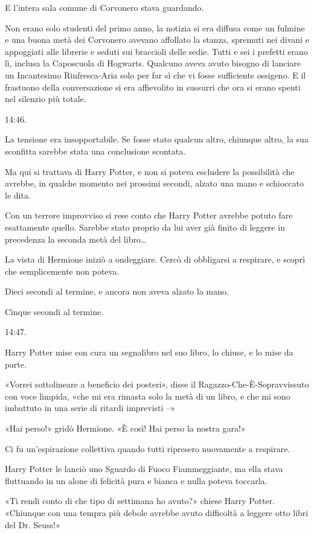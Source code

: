 E l’intera sala comune di Corvonero stava guardando.

Non erano solo studenti del primo anno, la notizia si era diffusa come un fulmine e una buona metà dei Corvonero avevano affollato la stanza, spremuti nei divani e appoggiati alle librerie e seduti sui braccioli delle sedie. Tutti e sei i prefetti erano lì, inclusa la Caposcuola di Hogwarts. Qualcuno aveva avuto bisogno di lanciare un Incantesimo Rinfresca-Aria solo per far sì che vi fosse sufficiente ossigeno. E il frastuono della conversazione si era affievolito in sussurri che ora si erano spenti nel silenzio più totale.

14:46.

La tensione era insopportabile. Se fosse stato qualcun altro, chiunque altro, la sua sconfitta sarebbe stata una conclusione scontata.

Ma qui si trattava di Harry Potter, e non si poteva escludere la possibilità che avrebbe, in qualche momento nei prossimi secondi, alzato una mano e schioccato le dita.

Con un terrore improvviso si rese conto che Harry Potter avrebbe potuto fare esattamente quello. Sarebbe stato proprio da lui aver già finito di leggere in precedenza la seconda metà del libro…

La vista di Hermione iniziò a ondeggiare. Cercò di obbligarsi a respirare, e scoprì che semplicemente non poteva.

Dieci secondi al termine, e ancora non aveva alzato la mano.

Cinque secondi al termine.

14:47.

Harry Potter mise con cura un segnalibro nel suo libro, lo chiuse, e lo mise da parte.

«Vorrei sottolineare a beneficio dei posteri», disse il Ragazzo-Che-È-Sopravvissuto con voce limpida, «che mi era rimasta solo la metà di un libro, e che mi sono imbattuto in una serie di ritardi imprevisti –»

«Hai perso!» gridò Hermione. «È così! Hai perso la nostra gara!»

Ci fu un’espirazione collettiva quando tutti ripresero nuovamente a respirare.

Harry Potter le lanciò uno Sguardo di Fuoco Fiammeggiante, ma ella stava fluttuando in un alone di felicità pura e bianca e nulla poteva toccarla.

«Ti rendi conto di che tipo di settimana ho avuto?» chiese Harry Potter. «Chiunque con una tempra più debole avrebbe avuto difficoltà a leggere otto libri del Dr. Seuss!»

